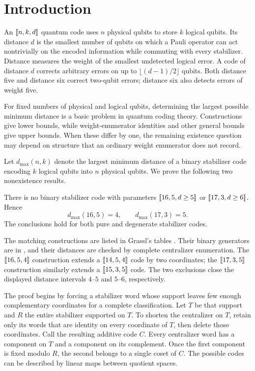 \section{Introduction}

An \([\![n,k,d]\!]\) quantum code uses \(n\) physical qubits to store
\(k\) logical qubits. Its distance \(d\) is the smallest number of
qubits on which a Pauli operator can act nontrivially on the encoded
information while commuting with every stabilizer. Distance measures
the weight of the smallest undetected logical error. A code of distance
\(d\) corrects arbitrary errors on up to \(\lfloor(d-1)/2\rfloor\)
qubits. Both distance five and distance six correct two-qubit errors;
distance six also detects errors of weight five.

For fixed numbers of physical and logical qubits, determining the largest
possible minimum distance is a basic problem in quantum coding theory.
Constructions give lower bounds, while weight-enumerator identities and
other general bounds give upper bounds. When these differ by one, the
remaining existence question may depend on structure that an ordinary
weight enumerator does not record.

Let \(d_{\max}(n,k)\) denote the largest minimum distance of a binary
stabilizer code encoding \(k\) logical qubits into \(n\) physical qubits.
We prove the following two nonexistence results.
\begin{theorem}\label{thm:main}
There is no binary stabilizer code with parameters
\([\![16,5,d\geq5]\!]\) or \([\![17,3,d\geq6]\!]\). Hence
\[
 d_{\max}(16,5)=4,\qquad d_{\max}(17,3)=5.
\]
The conclusions hold for both pure and degenerate stabilizer codes.
\end{theorem}
The matching constructions are listed in Grassl's tables \cite{grassl}.
Their binary generators are in , and their distances
are checked by complete centralizer enumeration. The \([\![16,5,4]\!]\)
construction extends a \([\![14,5,4]\!]\) code by two coordinates;
the \([\![17,3,5]\!]\) construction similarly extends a
\([\![15,3,5]\!]\) code. The two exclusions close the displayed distance
intervals \(4\)--\(5\) and \(5\)--\(6\), respectively.

The proof begins by forcing a stabilizer word whose support leaves few
enough complementary coordinates for a complete classification. Let
\(T\) be that support and \(R\) the entire stabilizer supported on
\(T\). To shorten the centralizer on \(T\), retain only its words that
are identity on every coordinate of \(T\), then delete those coordinates.
Call the resulting additive code \(C\).
Every centralizer word has a component on \(T\) and a component on its
complement. Once the first component is fixed modulo \(R\), the second
belongs to a single coset of \(C\). The possible codes can be
described by linear maps between quotient spaces.

